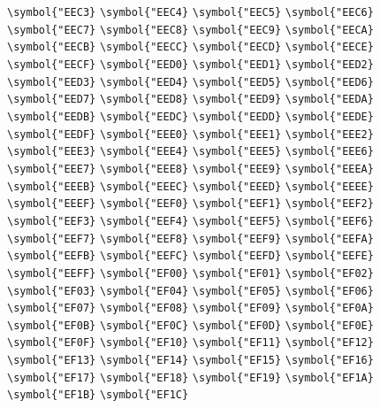 \documentclass{ctexbook}
\begin{document}
{\verb|\symbol{"EEC3}|  \verb|\symbol{"EEC4}|  \verb|\symbol{"EEC5}|  \verb|\symbol{"EEC6}|  \verb|\symbol{"EEC7}|  \verb|\symbol{"EEC8}|  \verb|\symbol{"EEC9}|  \verb|\symbol{"EECA}|  \verb|\symbol{"EECB}|  \verb|\symbol{"EECC}|  \verb|\symbol{"EECD}|  \verb|\symbol{"EECE}|  \verb|\symbol{"EECF}|  \verb|\symbol{"EED0}|  \verb|\symbol{"EED1}|  \verb|\symbol{"EED2}|  \verb|\symbol{"EED3}|  \verb|\symbol{"EED4}|  \verb|\symbol{"EED5}|  \verb|\symbol{"EED6}|  \verb|\symbol{"EED7}|  \verb|\symbol{"EED8}|  \verb|\symbol{"EED9}|  \verb|\symbol{"EEDA}|  \verb|\symbol{"EEDB}|  \verb|\symbol{"EEDC}|  \verb|\symbol{"EEDD}|  \verb|\symbol{"EEDE}|  \verb|\symbol{"EEDF}|  \verb|\symbol{"EEE0}|  \verb|\symbol{"EEE1}|  \verb|\symbol{"EEE2}|  \verb|\symbol{"EEE3}|  \verb|\symbol{"EEE4}|  \verb|\symbol{"EEE5}|  \verb|\symbol{"EEE6}|  \verb|\symbol{"EEE7}|  \verb|\symbol{"EEE8}|  \verb|\symbol{"EEE9}|  \verb|\symbol{"EEEA}|  \verb|\symbol{"EEEB}|  \verb|\symbol{"EEEC}|  \verb|\symbol{"EEED}|  \verb|\symbol{"EEEE}|  \verb|\symbol{"EEEF}|  \verb|\symbol{"EEF0}|  \verb|\symbol{"EEF1}|  \verb|\symbol{"EEF2}|  \verb|\symbol{"EEF3}|  \verb|\symbol{"EEF4}|  \verb|\symbol{"EEF5}|  \verb|\symbol{"EEF6}|  \verb|\symbol{"EEF7}|  \verb|\symbol{"EEF8}|  \verb|\symbol{"EEF9}|  \verb|\symbol{"EEFA}|  \verb|\symbol{"EEFB}|  \verb|\symbol{"EEFC}|  \verb|\symbol{"EEFD}|  \verb|\symbol{"EEFE}|  \verb|\symbol{"EEFF}|  \verb|\symbol{"EF00}|  \verb|\symbol{"EF01}|  \verb|\symbol{"EF02}|  \verb|\symbol{"EF03}|  \verb|\symbol{"EF04}|  \verb|\symbol{"EF05}|  \verb|\symbol{"EF06}|  \verb|\symbol{"EF07}|  \verb|\symbol{"EF08}|  \verb|\symbol{"EF09}|  \verb|\symbol{"EF0A}|  \verb|\symbol{"EF0B}|  \verb|\symbol{"EF0C}|  \verb|\symbol{"EF0D}|  \verb|\symbol{"EF0E}|  \verb|\symbol{"EF0F}|  \verb|\symbol{"EF10}|  \verb|\symbol{"EF11}|  \verb|\symbol{"EF12}|  \verb|\symbol{"EF13}|  \verb|\symbol{"EF14}|  \verb|\symbol{"EF15}|  \verb|\symbol{"EF16}|  \verb|\symbol{"EF17}|  \verb|\symbol{"EF18}|  \verb|\symbol{"EF19}|  \verb|\symbol{"EF1A}|  \verb|\symbol{"EF1B}|  \verb|\symbol{"EF1C}|  }
\end{document}
